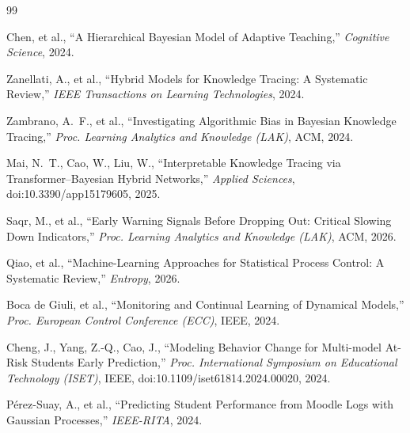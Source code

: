 \documentclass[12pt]{report}
\begin{document}
\newpage
\tableofcontents
\newpage
\listoffigures
\newpage
\listoftables
\newpage









\newpage
\begin{thebibliography}{99}

 Chen, et al., ``A Hierarchical Bayesian Model of Adaptive Teaching,'' \textit{Cognitive Science}, 2024.

 Zanellati, A., et al., ``Hybrid Models for Knowledge Tracing: A Systematic Review,'' \textit{IEEE Transactions on Learning Technologies}, 2024.

 Zambrano, A.~F., et al., ``Investigating Algorithmic Bias in Bayesian Knowledge Tracing,'' \textit{Proc. Learning Analytics and Knowledge (LAK)}, ACM, 2024.

 Mai, N.~T., Cao, W., Liu, W., ``Interpretable Knowledge Tracing via Transformer--Bayesian Hybrid Networks,'' \textit{Applied Sciences}, doi:10.3390/app15179605, 2025.

 Saqr, M., et al., ``Early Warning Signals Before Dropping Out: Critical Slowing Down Indicators,'' \textit{Proc. Learning Analytics and Knowledge (LAK)}, ACM, 2026.

 Qiao, et al., ``Machine-Learning Approaches for Statistical Process Control: A Systematic Review,'' \textit{Entropy}, 2026.

 Boca de Giuli, et al., ``Monitoring and Continual Learning of Dynamical Models,'' \textit{Proc. European Control Conference (ECC)}, IEEE, 2024.

 Cheng, J., Yang, Z.-Q., Cao, J., ``Modeling Behavior Change for Multi-model At-Risk Students Early Prediction,'' \textit{Proc. International Symposium on Educational Technology (ISET)}, IEEE, doi:10.1109/iset61814.2024.00020, 2024.

 P\'erez-Suay, A., et al., ``Predicting Student Performance from Moodle Logs with Gaussian Processes,'' \textit{IEEE-RITA}, 2024.


\end{thebibliography}
\end{document}
